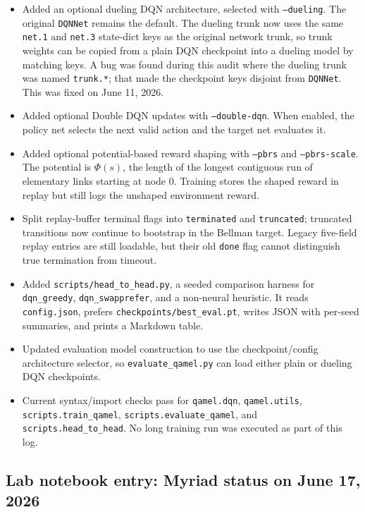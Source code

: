 \documentclass[11pt]{article}
\newcommand{\code}[1]{\texttt{#1}}
\newcommand{\file}[1]{\texttt{\small #1}}
\begin{document}
\begin{itemize}
  \item Added an optional dueling DQN architecture, selected with \code{--dueling}. The original \code{DQNNet} remains the default. The dueling trunk now uses the same \code{net.1} and \code{net.3} state-dict keys as the original network trunk, so trunk weights can be copied from a plain DQN checkpoint into a dueling model by matching keys. A bug was found during this audit where the dueling trunk was named \code{trunk.*}; that made the checkpoint keys disjoint from \code{DQNNet}. This was fixed on June 11, 2026.
  \item Added optional Double DQN updates with \code{--double-dqn}. When enabled, the policy net selects the next valid action and the target net evaluates it.
  \item Added optional potential-based reward shaping with \code{--pbrs} and \code{--pbrs-scale}. The potential is $\Phi(s)$, the length of the longest contiguous run of elementary links starting at node 0. Training stores the shaped reward in replay but still logs the unshaped environment reward.
  \item Split replay-buffer terminal flags into \code{terminated} and \code{truncated}; truncated transitions now continue to bootstrap in the Bellman target. Legacy five-field replay entries are still loadable, but their old \code{done} flag cannot distinguish true termination from timeout.
  \item Added \file{scripts/head\_to\_head.py}, a seeded comparison harness for \code{dqn\_greedy}, \code{dqn\_swapprefer}, and a non-neural heuristic. It reads \file{config.json}, prefers \file{checkpoints/best\_eval.pt}, writes JSON with per-seed summaries, and prints a Markdown table.
  \item Updated evaluation model construction to use the checkpoint/config architecture selector, so \code{evaluate\_qamel.py} can load either plain or dueling DQN checkpoints.
  \item Current syntax/import checks pass for \code{qamel.dqn}, \code{qamel.utils}, \code{scripts.train\_qamel}, \code{scripts.evaluate\_qamel}, and \code{scripts.head\_to\_head}. No long training run was executed as part of this log.
\end{itemize}

\subsection{Lab notebook entry: Myriad status on June 17, 2026}
\label{sec:lablog-2026-06-17}
\end{document}
